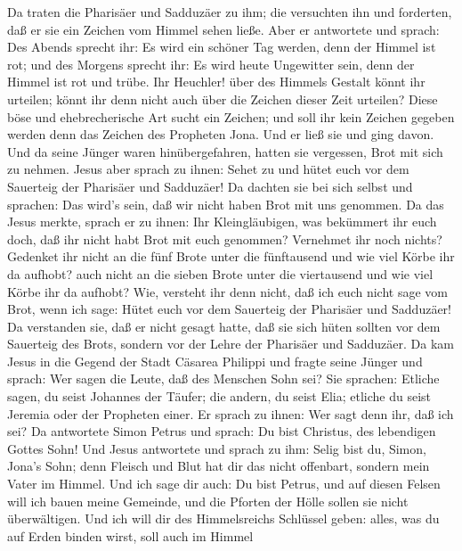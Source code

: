  Da traten die Pharisäer und Sadduzäer zu ihm; die
versuchten ihn und forderten, daß er sie ein Zeichen vom Himmel sehen
ließe.  Aber er antwortete und sprach: Des Abends sprecht
ihr: Es wird ein schöner Tag werden, denn der Himmel ist rot;
 und des Morgens sprecht ihr: Es wird heute Ungewitter sein,
denn der Himmel ist rot und trübe. Ihr Heuchler! über des Himmels
Gestalt könnt ihr urteilen; könnt ihr denn nicht auch über die Zeichen
dieser Zeit urteilen?  Diese böse und ehebrecherische Art
sucht ein Zeichen; und soll ihr kein Zeichen gegeben werden denn das
Zeichen des Propheten Jona. Und er ließ sie und ging davon. 
Und da seine Jünger waren hinübergefahren, hatten sie vergessen, Brot
mit sich zu nehmen.  Jesus aber sprach zu ihnen: Sehet zu
und hütet euch vor dem Sauerteig der Pharisäer und Sadduzäer!
 Da dachten sie bei sich selbst und sprachen: Das wird's
sein, daß wir nicht haben Brot mit uns genommen.  Da das
Jesus merkte, sprach er zu ihnen: Ihr Kleingläubigen, was bekümmert ihr
euch doch, daß ihr nicht habt Brot mit euch genommen? 
Vernehmet ihr noch nichts? Gedenket ihr nicht an die fünf Brote unter
die fünftausend und wie viel Körbe ihr da aufhobt?  auch
nicht an die sieben Brote unter die viertausend und wie viel Körbe ihr
da aufhobt?  Wie, versteht ihr denn nicht, daß ich euch
nicht sage vom Brot, wenn ich sage: Hütet euch vor dem Sauerteig der
Pharisäer und Sadduzäer!  Da verstanden sie, daß er nicht
gesagt hatte, daß sie sich hüten sollten vor dem Sauerteig des Brots,
sondern vor der Lehre der Pharisäer und Sadduzäer.  Da kam
Jesus in die Gegend der Stadt Cäsarea Philippi und fragte seine Jünger
und sprach: Wer sagen die Leute, daß des Menschen Sohn sei?
 Sie sprachen: Etliche sagen, du seist Johannes der Täufer;
die andern, du seist Elia; etliche du seist Jeremia oder der Propheten
einer.  Er sprach zu ihnen: Wer sagt denn ihr, daß ich sei?
 Da antwortete Simon Petrus und sprach: Du bist Christus,
des lebendigen Gottes Sohn!  Und Jesus antwortete und
sprach zu ihm: Selig bist du, Simon, Jona's Sohn; denn Fleisch und Blut
hat dir das nicht offenbart, sondern mein Vater im Himmel. 
Und ich sage dir auch: Du bist Petrus, und auf diesen Felsen will ich
bauen meine Gemeinde, und die Pforten der Hölle sollen sie nicht
überwältigen.  Und ich will dir des Himmelsreichs Schlüssel
geben: alles, was du auf Erden binden wirst, soll auch im Himmel
